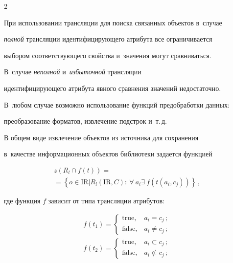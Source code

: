 \begin{multicols}{2}
    

    При использовании трансляции для поиска связанных объектов в~случае 

\textit{полной} трансляции идентифицирующего атрибута все ограничивается 

выбо\-ром соответствующего свойства и~значения могут сравниваться. 

В~случае \textit{неполной} и~\textit{избыточной} трансляции 

идентифицирующего атрибута явного сравнения значений недостаточно. 

В~любом случае возможно использование функций предобработки данных: 

преобразование форматов, извлечение подстрок и~т.\,д.

    

    В общем виде извлечение объектов из источника для сохранения 

в~качестве информационных объектов библиотеки задается функцией

    \begin{multline*}

    z\left( R_l\cap f(t)\right) = {}\\

    {}=\left\{ o\in \mathrm{IR}\vert R_l(\mathrm{IR},C):\ \forall\ a_i\exists\ 

f(t(a_i, c_j))\right\}\,,

    \end{multline*}

где функция $f$ зависит от типа трансляции атрибутов:

\begin{gather*}

f(t_1)=\begin{cases}

\mbox{true}, &\ a_i=c_j\,;\\

\mbox{false}, &\  a_i\not=c_j\,;

\end{cases}\\

f(t_2)= \begin{cases}

\mbox{true}, &\ a_i\subset c_j\,;\\

\mbox{false}, &\ a_i \not\subset c_j\,;

\end{cases}

\\


\end{gather*}
\end{multicols}

